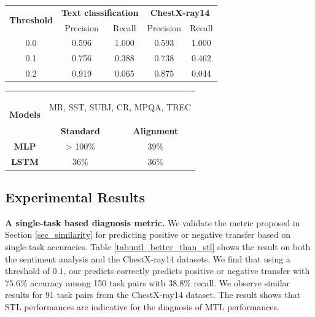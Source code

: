 \begin{table}
\begin{minipage}[t]{.58\textwidth}
	\centering
  \begin{tabular}{c c c c c}
	\toprule
		\multirow{2}{*}{{\bf Threshold}}  & \multicolumn{2}{c}{{\bf Text
		classification}} & \multicolumn{2}{c}{{\bf ChestX-ray14}} \\
		& Precision &  Recall & Precision &  Recall \\
		\cmidrule(lr){1-1} \cmidrule(lr){2-3} \cmidrule(lr){4-5}
		0.0 & 0.596 & 1.000 & 0.593 & 1.000 \\
		0.1 & 0.756 & 0.388 & 0.738 & 0.462 \\
		0.2 & 0.919 & 0.065 & 0.875 & 0.044 \\
	\bottomrule
	\end{tabular}
	\vspace{0.1in}
	\label{tab:mtl_better_than_stl}
\end{minipage}
\quad
\begin{minipage}[t]{.40\textwidth}
	\centering
	\begin{tabular}{c c c}
		\toprule
		\multirow{2}{*}{{\bf Models}} & \multicolumn{2}{c}{\begin{minipage}{1.1in}\begin{center}
		MR, SST, SUBJ, CR, MPQA, TREC\end{center}\end{minipage}} \\
		\cmidrule(lr){2-3}
		& {\bf Standard} & {\bf Alignment} \\
		\midrule
		{\bf MLP}  & > 100\% & 39\% \\
		{\bf LSTM} & 36\% & 36\% \\
		\bottomrule
		\end{tabular}
	\vspace{0.1in}
	\label{tab:taskonomy}
\end{minipage}
\end{table}

\subsection{Experimental Results}

\textbf{A single-task based diagnosis metric.}
We validate the metric proposed in Section \ref{sec_similarity} for predicting positive or negative transfer based on single-task accuracies.
Table \ref{tab:mtl_better_than_stl} shows the result on both the sentiment analysis and the ChestX-ray14 datasets.
We find that using a threshold of $0.1$, our predicts correctly predicts positive or negative transfer with $75.6\%$ accuracy among 150 task pairs with $38.8\%$ recall.
We observe similar results for 91 task pairs from the ChestX-ray14 dataset.
The result shows that STL performances are indicative for the diagnosis of MTL performances.

